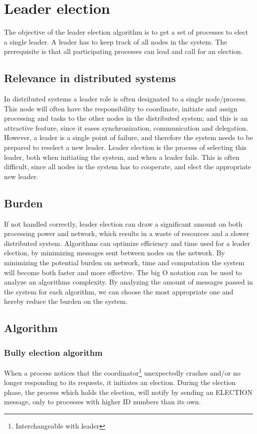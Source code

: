 \section{Leader election}
The objective of the leader election algorithm is to get a set of processes to elect a single leader. A leader has to keep track of all nodes in the system. The prerequisite is that all participating processes can lead and call for an election.

\subsection{Relevance in distributed systems}
In distributed systems a leader role is often designated to a single node/process. This node will often have the responsibility to coordinate, initiate and assign processing and tasks to the other nodes in the distributed system; and this is an attractive feature, since it eases synchronization, communication and delegation.
However, a leader is a single point of failure, and therefore the system needs to be prepared to reselect a new leader.
Leader election is the process of selecting this leader, both when initiating the system, and when a leader fails.
This is often difficult, since all nodes in the system has to cooperate, and elect the appropriate new leader.

\subsection{Burden}
If not handled correctly, leader election can draw a significant amount on both processing power and network, which results in a waste of resources and a slower distributed system. Algorithms can optimize efficiency and time used for a leader election, by minimizing messages sent between nodes on the network.
By minimizing the potential burden on network, time and computation the system will become both faster and more effective.
The big O notation can be used to analyze an algorithms complexity. By analyzing the amount of messages passed in the system for each algorithm, we can choose the most appropriate one and hereby reduce the burden on the system.

\subsection{Algorithm}

\subsubsection{Bully election algorithm}
When a process notices that the coordinator\footnote{Interchangeable with leader} unexpectedly crashes and/or no longer responding to its requests, it initiates an election.
During the election phase, the process which holds the election, will notify by sending an ELECTION message, only to processes with higher ID numbers than its own.

